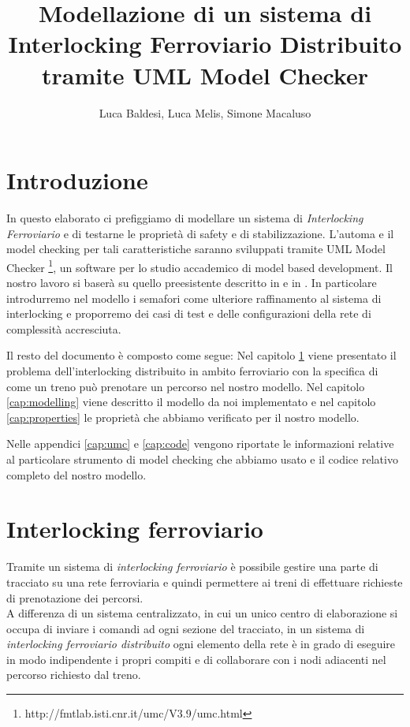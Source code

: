 \documentclass[10pt,a4paper,oneside]{report}
\author{Luca Baldesi, Luca Melis, Simone Macaluso}
\title{Modellazione di un sistema di
Interlocking Ferroviario Distribuito
tramite UML Model Checker
}
\begin{document}
\maketitle

\chapter*{Introduzione}
In questo elaborato ci prefiggiamo di modellare un sistema di \emph{Interlocking Ferroviario} e di testarne le proprietà di safety e di stabilizzazione. L'automa e il model checking per tali caratteristiche saranno sviluppati tramite UML Model Checker \footnote{http://fmtlab.isti.cnr.it/umc/V3.9/umc.html}, un software per lo studio accademico di model based development. Il nostro lavoro si baserà su quello preesistente descritto in \cite{Paolieri} e in \cite{RossettoRocciolo}. In particolare introdurremo nel modello i semafori come ulteriore raffinamento al sistema di interlocking e proporremo dei casi di test e delle configurazioni della rete di complessità accresciuta.

Il resto del documento è composto come segue:
Nel capitolo \ref{cap:interlocking} viene presentato il problema dell'interlocking distribuito in ambito ferroviario con la specifica di come un treno può prenotare un percorso nel nostro modello. Nel capitolo \ref{cap:modelling} viene descritto il modello da noi implementato e nel capitolo \ref{cap:properties} le proprietà che abbiamo verificato per il nostro modello.

Nelle appendici \ref{cap:umc} e \ref{cap:code} vengono riportate le informazioni relative al particolare strumento di model checking che abbiamo usato e il codice relativo completo del nostro modello.

\chapter{Interlocking ferroviario}
\label{cap:interlocking}
Tramite un sistema di \textit{interlocking ferroviario} è possibile gestire una parte di tracciato su una rete ferroviaria e quindi permettere ai treni di effettuare richieste di prenotazione dei percorsi.\\
A differenza di un sistema centralizzato, in cui un unico centro di elaborazione si occupa di inviare i comandi ad ogni sezione del tracciato, in un sistema di \textit{interlocking ferroviario distribuito} ogni elemento della rete è in grado di eseguire in modo indipendente i propri compiti e di collaborare con i nodi adiacenti nel percorso richiesto dal treno.
\end{document}
